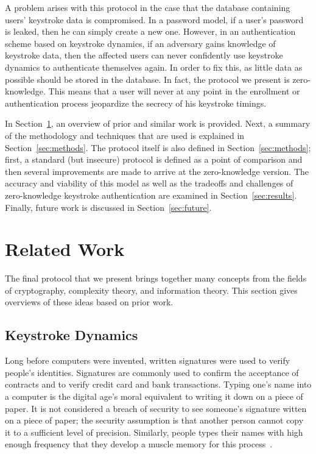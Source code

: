\documentclass[11pt]{article}
\begin{document}
A problem arises with this protocol in the case that the database containing users' keystroke data is compromised. In a password model, if a user's password is leaked, then he can simply create a new one. However, in an authentication scheme based on keystroke dynamics, if an adversary gains knowledge of keystroke data, then the affected users can never confidently use keystroke dynamics to authenticate themselves again. In order to fix this, as little data as possible should be stored in the database. In fact, the protocol we present is zero-knowledge. This means that a user will never at any point in the enrollment or authentication process jeopardize the secrecy of his keystroke timings.

In Section~\ref{sec:related}, an overview of prior and similar work is provided. Next, a summary of the methodology and techniques that are used is explained in Section~\ref{sec:methods}. The protocol itself is also defined in Section~\ref{sec:methods}; first, a standard (but insecure) protocol is defined as a point of comparison and then several improvements are made to arrive at the zero-knowledge version. The accuracy and viability of this model as well as the tradeoffs and challenges of zero-knowledge keystroke authentication are examined in Section~\ref{sec:results}. Finally, future work is discussed in Section~\ref{sec:future}.

\section{Related Work}
\label{sec:related}
The final protocol that we present brings together many concepts from the fields of cryptography, complexity theory, and information theory. This section gives overviews of these ideas based on prior work.

\subsection{Keystroke Dynamics}
\label{sec:bg-keystroke}
Long before computers were invented, written signatures were used to verify people's identities. Signatures are commonly used to confirm the acceptance of contracts and to verify credit card and bank transactions. Typing one's name into a computer is the digital age's moral equivalent to writing it down on a piece of paper. It is not considered a breach of security to see someone's signature witten on a piece of paper; the security assumption is that another person cannot copy it to a sufficient level of precision. Similarly, people types their names with high enough frequency that they develop a muscle memory for this process~\cite{monrose:authentication}.
\end{document}

